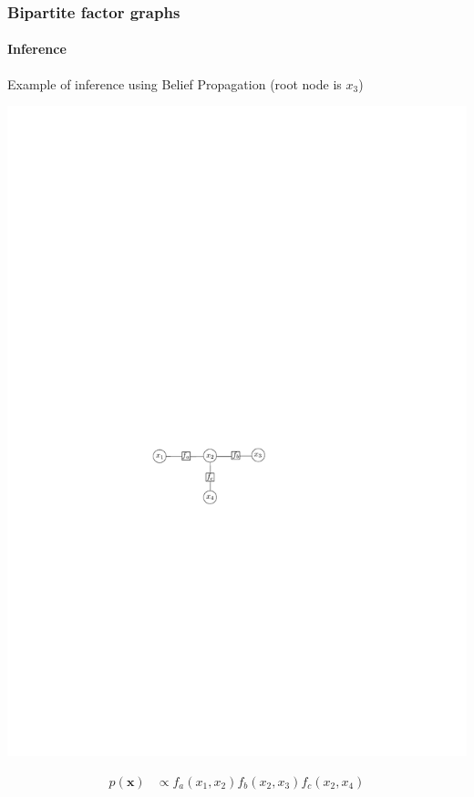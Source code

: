 \documentclass[slidestop,compress,mathserif]{beamer}
\begin{document}
\begin{frame}
	\frametitle{Bipartite factor graphs}
    \framesubtitle{Inference}
    \begin{description}
    \item[Example of inference using Belief Propagation (root node is $x_3$)]
        \end{description}
\begin{center}
\includegraphics[width=.4\textwidth]{bpex1}
\end{center}
    \begin{align*}
    p(\mathbf{x})& \propto f_a(x_1,x_2)f_b(x_2,x_3)f_c(x_2,x_4)
    \end{align*}
\end{frame}
\end{document}
